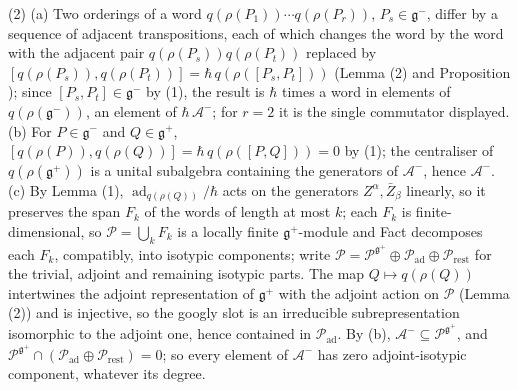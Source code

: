 (2) (a) Two orderings of a word $q(\rho(P_1))\cdots q(\rho(P_r))$, $P_s \in \mathfrak{g}^-$, differ by a sequence of adjacent transpositions, each of which changes the word by the word with the adjacent pair $q(\rho(P_s))q(\rho(P_t))$ replaced by $[q(\rho(P_s)), q(\rho(P_t))] = \hbar\,q(\rho([P_s, P_t]))$ (Lemma (2) and Proposition ); since $[P_s, P_t] \in \mathfrak{g}^-$ by (1), the result is $\hbar$ times a word in elements of $q(\rho(\mathfrak{g}^-))$, an element of $\hbar\,\mathcal{A}^-$; for $r = 2$ it is the single commutator displayed. (b) For $P \in \mathfrak{g}^-$ and $Q \in \mathfrak{g}^+$, $[q(\rho(P)), q(\rho(Q))] = \hbar\,q(\rho([P,Q])) = 0$ by (1); the centraliser of $q(\rho(\mathfrak{g}^+))$ is a unital subalgebra containing the generators of $\mathcal{A}^-$, hence $\mathcal{A}^-$. (c) By Lemma (1), $\operatorname{ad}_{q(\rho(Q))}/\hbar$ acts on the generators $Z^\alpha, \bar Z_\beta$ linearly, so it preserves the span $F_k$ of the words of length at most $k$; each $F_k$ is finite-dimensional, so $\mathcal{P} = \bigcup_k F_k$ is a locally finite $\mathfrak{g}^+$-module and Fact  decomposes each $F_k$, compatibly, into isotypic components; write $\mathcal{P} = \mathcal{P}^{\mathfrak{g}^+} \oplus \mathcal{P}_{\mathrm{ad}} \oplus \mathcal{P}_{\mathrm{rest}}$ for the trivial, adjoint and remaining isotypic parts. The map $Q \mapsto q(\rho(Q))$ intertwines the adjoint representation of $\mathfrak{g}^+$ with the adjoint action on $\mathcal{P}$ (Lemma (2)) and is injective, so the googly slot is an irreducible subrepresentation isomorphic to the adjoint one, hence contained in $\mathcal{P}_{\mathrm{ad}}$. By (b), $\mathcal{A}^- \subseteq \mathcal{P}^{\mathfrak{g}^+}$, and $\mathcal{P}^{\mathfrak{g}^+} \cap (\mathcal{P}_{\mathrm{ad}} \oplus \mathcal{P}_{\mathrm{rest}}) = 0$; so every element of $\mathcal{A}^-$ has zero adjoint-isotypic component, whatever its degree.
